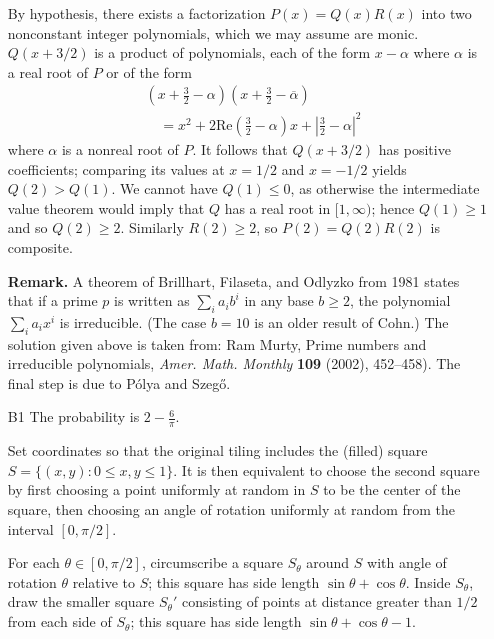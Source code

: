 \documentclass[amssymb,twocolumn,pra,10pt,aps]{revtex4-1}
\begin{document}
\begin{itemize}
By hypothesis, there exists a factorization $P(x) = Q(x)R(x)$ into two nonconstant integer polynomials, which we may assume are monic.
$Q(x + 3/2)$ is a product of polynomials, each of the form $x - \alpha$ where $\alpha$ is a real root of $P$
or of the form
\begin{align*}
&\left( x + \frac{3}{2} - \alpha\right) \left(x + \frac{3}{2} - \overline{\alpha} \right) \\
&\quad = x^2 + 2 \mathrm{Re}\left(\frac{3}{2} - \alpha\right) x + \left|\frac{3}{2} - \alpha \right|^2
\end{align*}
where $\alpha$ is a nonreal root of $P$. It follows that $Q(x+3/2)$ has positive coefficients;
comparing its values at $x=1/2$ and $x=-1/2$ yields $Q(2) > Q(1)$. We cannot have $Q(1) \leq 0$, as otherwise the intermediate value theorem would imply that $Q$ has a real root in $[1, \infty)$; hence $Q(1)  \geq 1$ and so $Q(2) \geq 2$.
Similarly $R(2) \geq 2$, so $P(2) = Q(2) R(2)$ is composite.

\noindent
\textbf{Remark.}
A theorem of Brillhart, Filaseta, and Odlyzko from 1981 states that if a prime $p$ is written as $\sum_i a_i b^i$ in any base $b \geq 2$, the polynomial $\sum_i a_i x^i$ is irreducible.
(The case $b=10$ is an older result of Cohn.) 
The solution given above is taken from: Ram Murty, Prime numbers and irreducible polynomials, \textit{Amer. Math. Monthly} \textbf{109} (2002), 452--458). The final step is due to P\'olya and Szeg\H{o}.

\item[B1]
The probability is $2 - \frac{6}{\pi}$.

Set coordinates so that the original tiling includes the (filled) square 
$S = \{(x,y): 0 \leq x,y \leq 1 \}$. It is then equivalent to choose the second square by first choosing a point uniformly at random in $S$ to be the center of the square, then choosing an angle of rotation uniformly at random from the interval $[0, \pi/2]$.

For each $\theta \in [0, \pi/2]$, circumscribe a square $S_\theta$ around $S$ with angle of rotation $\theta$ relative to $S$; this square has side length $\sin \theta + \cos \theta$. Inside $S_\theta$, draw the smaller square $S_\theta'$ consisting of points at distance greater than $1/2$ from each side of $S_\theta$; this square has side length $\sin \theta + \cos \theta - 1$. 


\end{itemize}
\end{document}
